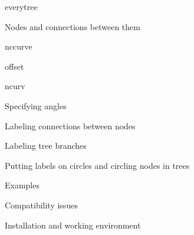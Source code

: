  {\fam \slfam \twelvesl everytree} \par 
{} {Nodes and connections between them } \par 
{} {\fam \slfam \twelvesl nccurve} \par 
{} {\fam \slfam \twelvesl offset} \par 
{} {\fam \slfam \twelvesl ncurv} \par 
{} {Specifying angles} \par 
{} {Labeling connections between nodes} \par 
{} {Labeling tree branches} \par 
{} {Putting labels on circles and circling nodes in trees} \par 
{} {Examples } \par 
{} {Compatibility issues } \par 
{} {Installation and working environment} \par 

